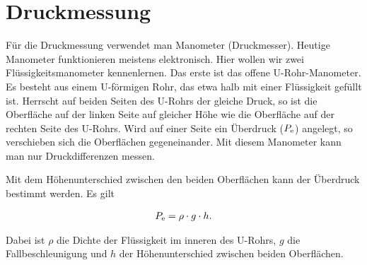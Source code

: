 \section*{Druckmessung}
Für die Druckmessung verwendet man Manometer (Druckmesser). Heutige Manometer funktionieren meistens
elektronisch. Hier wollen wir zwei Flüssigkeitsmanometer kennenlernen.
Das erste ist das offene U-Rohr-Manometer. Es besteht aus einem U-förmigen Rohr, das etwa halb mit einer Flüssigkeit
gefüllt ist. Herrscht auf beiden Seiten des U-Rohrs der gleiche Druck, so ist die Oberfläche auf der linken Seite
auf gleicher Höhe wie die Oberfläche auf der rechten Seite des U-Rohrs.
Wird auf einer Seite ein Überdruck ($P_{\textrm e}$) angelegt, so verschieben sich die Oberflächen gegeneinander.
Mit diesem Manometer kann man nur Druckdifferenzen messen.

\begin{minipage}{0.5\textwidth}
\end{minipage}
\begin{minipage}{0.5\textwidth}
Mit dem Höhenunterschied zwischen den beiden Oberflächen kann der Überdruck bestimmt werden. Es gilt


\begin{cbox}
	\begin{eqnarray*}
		P_{\textrm e}= \rho\cdot g\cdot h.
	\end{eqnarray*}
\end{cbox}

Dabei ist $\rho$ die Dichte der Flüssigkeit im inneren des U-Rohrs, $g$ die Fallbeschleunigung und $h$ der Höhenunterschied
zwischen beiden Oberflächen.
\end{minipage}



